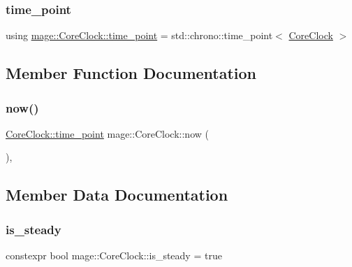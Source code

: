 \subsubsection{\texorpdfstring{time\+\_\+point}{time\_point}}
{\footnotesize\ttfamily using \hyperlink{structmage_1_1_core_clock_a1ea0193dea9647827d27469ec9e3b61c}{mage\+::\+Core\+Clock\+::time\+\_\+point} =  std\+::chrono\+::time\+\_\+point$<$ \hyperlink{structmage_1_1_core_clock}{Core\+Clock} $>$}



\subsection{Member Function Documentation}
\hypertarget{structmage_1_1_core_clock_addea160814d296009c10986faabe08bd}{}\label{structmage_1_1_core_clock_addea160814d296009c10986faabe08bd} 
\subsubsection{\texorpdfstring{now()}{now()}}
{\footnotesize\ttfamily \hyperlink{structmage_1_1_core_clock_a1ea0193dea9647827d27469ec9e3b61c}{Core\+Clock\+::time\+\_\+point} mage\+::\+Core\+Clock\+::now (\begin{DoxyParamCaption}{ }\end{DoxyParamCaption})\hspace{0.3cm}{\ttfamily [static]}, {\ttfamily [noexcept]}}



\subsection{Member Data Documentation}
\hypertarget{structmage_1_1_core_clock_ae6481fa7adddf1e9fefd45fba2e20516}{}\label{structmage_1_1_core_clock_ae6481fa7adddf1e9fefd45fba2e20516} 
\subsubsection{\texorpdfstring{is\+\_\+steady}{is\_steady}}
{\footnotesize\ttfamily constexpr bool mage\+::\+Core\+Clock\+::is\+\_\+steady = true\hspace{0.3cm}{\ttfamily [static]}}

